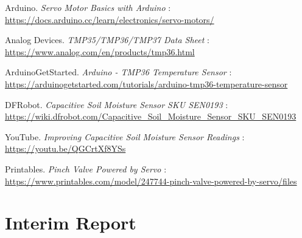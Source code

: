 \documentclass[a4paper,11pt]{article}
\begin{document}
\newpage
\appendix
\begin{thebibliography}{9}

Arduino. \textit{Servo Motor Basics with Arduino} : \\
\url{https://docs.arduino.cc/learn/electronics/servo-motors/}

Analog Devices. \textit{TMP35/TMP36/TMP37 Data Sheet} : \\
\url{https://www.analog.com/en/products/tmp36.html} 

ArduinoGetStarted. \textit{Arduino - TMP36 Temperature Sensor} : \\
\url{https://arduinogetstarted.com/tutorials/arduino-tmp36-temperature-sensor}

DFRobot. \textit{Capacitive Soil Moisture Sensor SKU SEN0193} : \\
\url{https://wiki.dfrobot.com/Capacitive_Soil_Moisture_Sensor_SKU_SEN0193}

YouTube. \textit{Improving Capacitive Soil Moisture Sensor Readings} : \\
\url{https://youtu.be/QGCrtXf8YSs}

Printables. \textit{Pinch Valve Powered by Servo} : \\
\url{https://www.printables.com/model/247744-pinch-valve-powered-by-servo/files}

\end{thebibliography}

\section{Interim Report}
\end{document}
